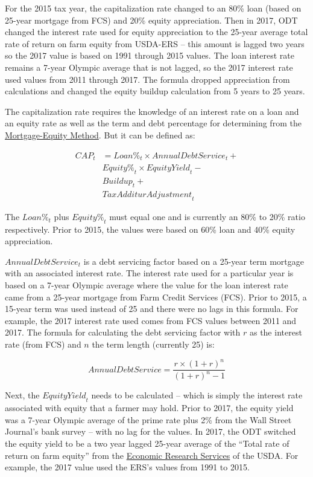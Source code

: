 \documentclass[]{article}
\begin{document}
For the 2015 tax year, the capitalization rate changed to an 80\% loan
(based on 25-year mortgage from FCS) and 20\% equity appreciation. Then
in 2017, ODT changed the interest rate used for equity appreciation to
the 25-year average total rate of return on farm equity from USDA-ERS --
this amount is lagged two years so the 2017 value is based on 1991
through 2015 values. The loan interest rate remains a 7-year Olympic
average that is not lagged, so the 2017 interest rate used values from
2011 through 2017. The formula dropped appreciation from calculations
and changed the equity buildup calculation from 5 years to 25 years.

The capitalization rate requires the knowledge of an interest rate on a
loan and an equity rate as well as the term and debt percentage for
determining from the
\href{http://www.commercialappraisalsoftware.dcfsoftware.com/mtgequity.htm}{Mortgage-Equity
Method}. But it can be defined as:

\[ \begin{aligned}
{CAP_t} &= {Loan \%}_t \times {Annual Debt Service}_t + \\
& {Equity \%}_t \times {Equity Yield}_t - \nonumber \\
& {Buildup}_t + \nonumber \\
& {Tax Additur Adjustment}_t
\end{aligned} \]

The \({Loan \%}_t\) plus \({Equity \%}_t\) must equal one and is
currently an 80\% to 20\% ratio respectively. Prior to 2015, the values
were based on 60\% loan and 40\% equity appreciation.

\({Annual Debt Service}_t\) is a debt servicing factor based on a
25-year term mortgage with an associated interest rate. The interest
rate used for a particular year is based on a 7-year Olympic average
where the value for the loan interest rate came from a 25-year mortgage
from Farm Credit Services (FCS). Prior to 2015, a 15-year term was used
instead of 25 and there were no lags in this formula. For example, the
2017 interest rate used comes from FCS values between 2011 and 2017. The
formula for calculating the debt servicing factor with \(r\) as the
interest rate (from FCS) and \(n\) the term length (currently 25) is:

\[ {Annual Debt Service} = \frac{r \times (1 + r)^n}{(1 + r)^n - 1} \]

Next, the \({Equity Yield}_t\) needs to be calculated -- which is simply
the interest rate associated with equity that a farmer may hold. Prior
to 2017, the equity yield was a 7-year Olympic average of the prime rate
plus 2\% from the Wall Street Journal's bank survey -- with no lag for
the values. In 2017, the ODT switched the equity yield to be a two year
lagged 25-year average of the ``Total rate of return on farm equity''
from the \href{https://data.ers.usda.gov/reports.aspx?ID=17838}{Economic
Research Services} of the USDA. For example, the 2017 value used the
ERS's values from 1991 to 2015.
\end{document}
